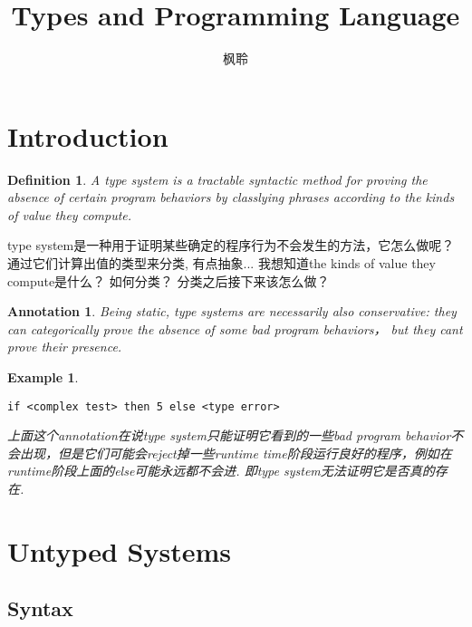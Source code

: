 \documentclass{article}
\newtheorem{example}[theorem]{Example}
\newtheorem{definition}[theorem]{Definition}
\newtheorem{annotation}[theorem]{Annotation}
\begin{document}
\title{Types and Programming Language}
\author{枫聆}
\maketitle
\tableofcontents

\newpage
\section{Introduction}

\begin{definition}
\rm A {\color{red} type system} is a tractable syntactic method for proving the absence of certain program behaviors by classlying phrases according to the kinds of value they compute.
\end{definition}

{\color{blue} type system是一种用于证明某些确定的程序行为不会发生的方法，它怎么做呢？通过它们计算出值的类型来分类, 有点抽象... 我想知道the kinds of value they compute是什么？ 如何分类？ 分类之后接下来该怎么做？}

\begin{annotation}
\rm Being static, type systems are necessarily also {\color{red}conservative}: they can categorically prove the absence of some bad program behaviors， but they cant prove their presence.
\end{annotation}

\lstset{numbers=left, numberstyle=\tiny, stepnumber=2, numbersep=5pt}

\begin{example}
\rm
\begin{lstlisting}
if <complex test> then 5 else <type error>
\end{lstlisting}
{\color{blue} 上面这个annotation在说type system只能证明它看到的一些bad program behavior不会出现，但是它们可能会reject掉一些runtime time阶段运行良好的程序，例如在runtime阶段上面的else可能永远都不会进. 即type system无法证明它是否真的存在}.
\end{example}

\newpage
\section{Untyped Systems}

\subsection{Syntax}
\end{document}
